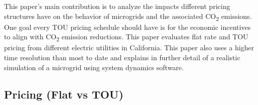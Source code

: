 \documentclass[conference]{IEEEtran}
\begin{document}
%			
			This paper's main contribution is to analyze the impacts different pricing structures have on the behavior of microgrids and the associated CO\textsubscript{2} emissions. One goal every TOU pricing schedule should have is for the economic incentives to align with CO\textsubscript{2} emission reductions. This paper evaluates flat rate and TOU pricing from different electric utilities in California. This paper also uses a higher time resolution than most to date and explains in further detail of a realistic simulation of a microgrid using system dynamics software.  
    \subsection{Pricing (Flat vs TOU)}
%       			
\end{document}
